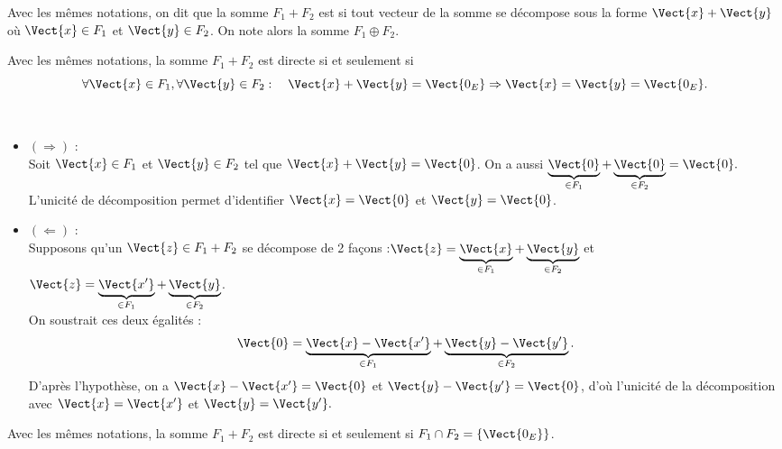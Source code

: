 \documentclass{book}
\begin{document}
\begin{Definition}
Avec les mêmes notations, on dit que la somme $F_1+F_2$ est  si tout vecteur de la somme se décompose  sous la forme $\Vect{x} +\Vect{y}$ où $\Vect{x}\in F_1$ et $\Vect{y}\in F_2$.
On note alors la somme $F_1\oplus F_2$.
\end{Definition}
\begin{Proposition}[Critère 1]
Avec les mêmes notations, la somme $F_1+F_2$ est directe si et seulement si
$$ \forall \Vect{x} \in F_1, \forall \Vect{y} \in F_2:\quad 
  \Vect{x} +\Vect{y} = \Vect{0_E} \Rightarrow \Vect{x} =  \Vect{y} = \Vect{0_E}.$$
\end{Proposition}
\begin{Demonstration}$\quad$\\
\begin{itemize}
\item \textit{$(\Longrightarrow)$} :\\
Soit $\Vect{x} \in F_1$ et $\Vect{y} \in F_2$ tel que $\Vect{x} + \Vect{y}=\Vect{0}$. On a aussi $\underbrace{\Vect{0}}_{\in F_1}+\underbrace{\Vect{0}}_{\in F_2}=\Vect{0}.$ L'unicité de décomposition permet d'identifier  $\Vect{x}=\Vect{0}$ et $\Vect{y}=\Vect{0}$.
\item \textit{$(\Longleftarrow)$} :\\
Supposons qu'un $\Vect{z} \in F_1+F_2$  se décompose de 2 façons :$\Vect{z}= \underbrace{\Vect{x}}_{\in F_1} + \underbrace{\Vect{y}}_{\in F_2}$ et $\Vect{z}= \underbrace{\Vect{x'}}_{\in F_1} + \underbrace{\Vect{y}}_{\in F_2}$. \\
On soustrait ces deux égalités :
$$\Vect{0}= \underbrace{\Vect{x} -\Vect{x'} }_{\in F_1}+\underbrace{\Vect{y} -\Vect{y'} }_{\in F_2}.$$
D'après l'hypothèse, on a   $\Vect{x} -\Vect{x'}=\Vect{0}$ et $\Vect{y} -\Vect{y'}=\Vect{0}$, d'où l'unicité de la décomposition avec $\Vect{x} =\Vect{x'}$ et $\Vect{y}=\Vect{y'}.$ 
\end{itemize}
\end{Demonstration}
\begin{Proposition}[Critère 2]
Avec les mêmes notations, la somme $F_1+F_2$ est directe si et seulement si $F_1\cap F_2 = \{\Vect{0_E}\}$.
\end{Proposition}
\end{document}
